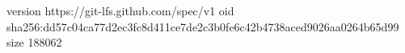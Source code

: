 version https://git-lfs.github.com/spec/v1
oid sha256:dd57c04ca77d2ec3fc8d411ce7de2c3b0fe6c42b4738aced9026aa0264b65d99
size 188062
